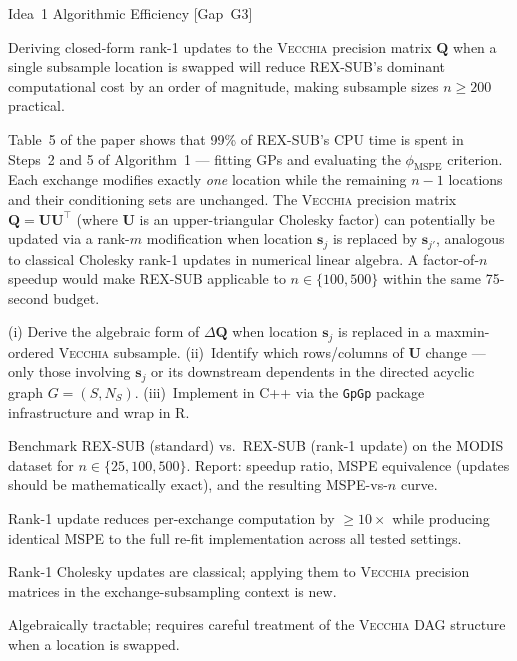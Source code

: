\documentclass[12pt, a4paper]{article}
\newcommand{\novelty}[1]{\textbf{Novelty:} #1/5}
\newcommand{\feasibility}[1]{\textbf{Feasibility:} #1/5}
\newcommand{\mspe}{$\phi_{\text{MSPE}}$}
\newcommand{\Vecchia}{\textsc{Vecchia}}
\begin{document}
\begin{ideabox}{Idea~1 \textbullet{} Algorithmic Efficiency [Gap~G3]}

\begin{description}[leftmargin=5em, labelwidth=4.5em]
  \item[\textbf{Hypothesis}]
    Deriving closed-form rank-1 updates to the \Vecchia{} precision matrix
    $\mathbf{Q}$ when a single subsample location is swapped will reduce REX-SUB's
    dominant computational cost by an order of magnitude, making subsample sizes
    $n \geq 200$ practical.

  \item[\textbf{Motivation}]
    Table~5 of the paper shows that 99\% of REX-SUB's CPU time is spent in Steps~2
    and 5 of Algorithm~1 --- fitting GPs and evaluating the \mspe{} criterion.
    Each exchange modifies exactly \emph{one} location while the remaining $n-1$
    locations and their conditioning sets are unchanged.  The \Vecchia{} precision
    matrix $\mathbf{Q} = \mathbf{U}\mathbf{U}^\top$ (where $\mathbf{U}$ is an
    upper-triangular Cholesky factor) can potentially be updated via a rank-$m$
    modification when location $\mathbf{s}_j$ is replaced by $\mathbf{s}_{j'}$,
    analogous to classical Cholesky rank-1 updates in numerical linear algebra.
    A factor-of-$n$ speedup would make REX-SUB applicable to $n \in \{100, 500\}$
    within the same 75-second budget.

  \item[\textbf{Approach}]
    (i) Derive the algebraic form of $\Delta\mathbf{Q}$ when location
    $\mathbf{s}_j$ is replaced in a maxmin-ordered \Vecchia{} subsample.
    (ii)~Identify which rows/columns of $\mathbf{U}$ change --- only those
    involving $\mathbf{s}_j$ or its downstream dependents in the directed acyclic
    graph $G = (S, N_S)$.  (iii)~Implement in C++ via the \texttt{GpGp}
    package infrastructure and wrap in R.

  \item[\textbf{Key experiment}]
    Benchmark REX-SUB (standard) vs.\ REX-SUB (rank-1 update) on the MODIS dataset
    for $n \in \{25, 100, 500\}$.  Report: speedup ratio, MSPE equivalence (updates
    should be mathematically exact), and the resulting MSPE-vs-$n$ curve.

  \item[\textbf{Success criterion}]
    Rank-1 update reduces per-exchange computation by $\geq 10\times$ while
    producing identical MSPE to the full re-fit implementation across all
    tested settings.

  \item[\novelty{4}]
    Rank-1 Cholesky updates are classical; applying them to \Vecchia{} precision
    matrices in the exchange-subsampling context is new.

  \item[\feasibility{4}]
    Algebraically tractable; requires careful treatment of the \Vecchia{} DAG
    structure when a location is swapped.
\end{description}

\end{ideabox}
\end{document}
